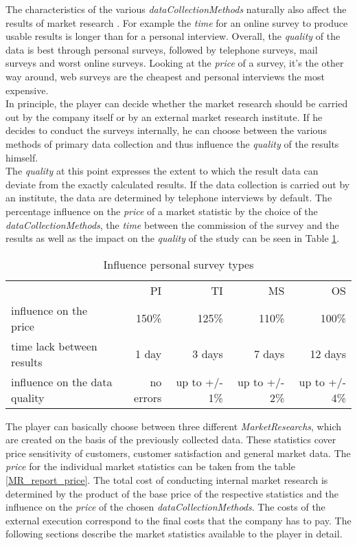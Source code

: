 The characteristics of the various \textit{dataCollectionMethods} naturally also affect the results of market research \cite[Chapter~4.4.2.1]{mooi_getting_2018}. For example the \textit{time} for an online survey to produce usable results is longer than for a personal interview. Overall, the \textit{quality} of the data is best through personal surveys, followed by telephone surveys, mail surveys and worst online surveys. Looking at the \textit{price} of a survey, it's the other way around, web surveys are the cheapest and personal interviews the most expensive. \\
In principle, the player can decide whether the market research should be carried out by the company itself or by an external market research institute. If he decides to conduct the surveys internally, he can choose between the various methods of primary data collection and thus influence the \textit{quality} of the results himself. \\
The \textit{quality} at this point expresses the extent to which the result data can deviate from the exactly calculated results. If the data collection is carried out by an institute, the data are determined by telephone interviews by default. The percentage influence on the \textit{price} of a market statistic by the choice of the \textit{dataCollectionMethods}, the \textit{time} between the commission of the survey and the results as well as the impact on the \textit{quality} of the study can be seen in Table \ref{MR_survey_types_influence}. \\

\begin{table}[ht]
\centering
\begin{tabular}{|l|r|r|r|r|}
\hline
                                 & PI           & TI             & MS             & OS \\
influence on the price           & 150\%        & 125\%          & 110\%          & 100\%   \\
time lack between results        & 1 day        & 3 days         & 7 days         & 12 days   \\
influence on the data quality    & no errors    & up to +/- 1\%  & up to +/- 2\%  & up to +/- 4\%   \\
\hline
\end{tabular}
\caption{Influence personal survey types}
\label{MR_survey_types_influence}
\end{table}

The player can basically choose between three different \textit{MarketResearchs}, which are created on the basis of the previously collected data. These statistics cover price sensitivity of customers, customer satisfaction and general market data. 
The \textit{price} for the individual market statistics can be taken from the table \ref{MR_report_price}. The total cost of conducting internal market research is determined by the product of the base price of the respective statistics and the influence on the \textit{price} of the chosen \textit{dataCollectionMethods}. The costs of the external execution correspond to the final costs that the company has to pay. 
The following sections describe the market statistics available to the player in detail. \\

